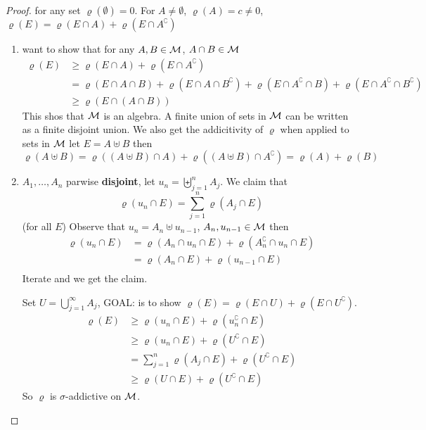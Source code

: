 \begin{proof}
  for any set $\varrho(\emptyset) = 0$. For $A \neq \emptyset$, $\varrho(A) = c \neq 0$,
  $\varrho(E) = \varrho(E \cap A) + \varrho(E\cap A^\complement)$
  \begin{enumerate}
    \item want to show that for any $A, B \in \mathcal M$, $A \cap B \in \mathcal M$
      \begin{align*}
        \varrho(E) &\ge \varrho(E \cap A) + \varrho(E \cap A^\complement) \\
        &= \varrho(E\cap A\cap B) + \varrho(E \cap A \cap B^\complement) + 
          \varrho(E \cap A^\complement \cap B) + \varrho(E \cap A^\complement \cap B^\complement) \\
        &\ge \varrho(E \cap (A \cap B)) 
      \end{align*}
      This shos that $\mathcal M$ is an algebra.
      A finite union of sets in $\mathcal M$ can be written as a finite disjoint union.
      We also get the addicitivity of $\varrho$ when applied to sets in $\mathcal M$
      let $E = A \uplus B$ then 
      \[\varrho(A \uplus B) = \varrho((A \uplus B) \cap A) + \varrho((A \uplus B) \cap A^\complement) = \varrho(A) + \varrho(B)\]
    \item $A_1, \dotsc, A_n$ parwise \textbf{disjoint}, let $u_n = \biguplus_{j=1}^n A_j$. 
      We claim that $$\varrho(u_n \cap E) = \sum_{j=1}^n \varrho(A_j \cap E)$$ (for all $E$)
      Observe that $u_n = A_n \uplus u_{n-1}$, $A_n, u_{n-1} \in \mathcal M$ then
      \begin{align*}
        \varrho(u_n \cap E) &= \varrho(A_n \cap u_n \cap E) + \varrho(A_n^\complement \cap u_n \cap E) \\
        &= \varrho(A_n \cap E) + \varrho(u_{n-1} \cap E) \\
      \end{align*}
      Iterate and we get the claim.

      Set $U = \bigcup_{j=1}^\infty A_j$, GOAL: is to show $\varrho(E) = \varrho(E \cap U) + \varrho(E \cap U^\complement)$.
      \begin{align*}
        \varrho(E) &\ge \varrho(u_n \cap E) + \varrho(u_n^\complement \cap E) \\
        &\ge \varrho(u_n \cap E) + \varrho(U^\complement \cap E) \\
        &= \sum_{j=1}^n\varrho(A_j \cap E) + \varrho(U^\complement \cap E) \\
        &\ge \varrho(U \cap E) + \varrho(U^\complement \cap E)
      \end{align*}
      So $\varrho$ is $\sigma$-addictive on $\mathcal M$.
  \end{enumerate} 
\end{proof}

